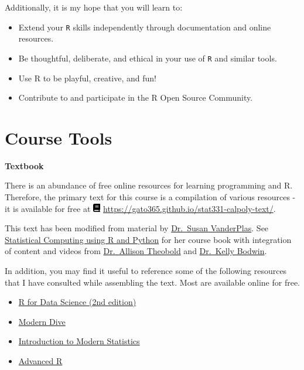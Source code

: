 \documentclass[
  11pt,
  letterpaper,
  DIV=11,
  numbers=noendperiod]{scrartcl}
\providecommand{\tightlist}{%
  \setlength{\itemsep}{0pt}\setlength{\parskip}{0pt}}\usepackage{longtable,booktabs,array}
\begin{document}
Additionally, it is my hope that you will learn to:

\begin{itemize}
\tightlist
\item
  Extend your \texttt{R} skills independently through documentation and
  online resources.
\item
  Be thoughtful, deliberate, and ethical in your use of \texttt{R} and
  similar tools.
\item
  Use R to be playful, creative, and fun!
\item
  Contribute to and participate in the R Open Source Community.
\end{itemize}

\hypertarget{course-tools}{%
\section{Course Tools}\label{course-tools}}

\textbf{Textbook}

There is an abundance of free online resources for learning programming
and R. Therefore, the primary text for this course is a compilation of
various resources - it is available for free at
\includegraphics[width=0.88em,height=1em]{index_files/figure-pdf/fa-icon-5ea3361430ab42477e0145b37bf037cc.pdf}
\url{https://gato365.github.io/stat331-calpoly-text/}.

This text has been modified from material by
\href{https://github.com/srvanderplas}{Dr.~Susan VanderPlas}. See
\href{https://srvanderplas.github.io/stat-computing-r-python/}{Statistical
Computing using R and Python} for her course book with integration of
content and videos from \href{https://github.com/atheobold}{Dr.~Allison
Theobold} and \href{https://github.com/kbodwin}{Dr.~Kelly Bodwin}.

In addition, you may find it useful to reference some of the following
resources that I have consulted while assembling the text. Most are
available online for free.

\begin{itemize}
\tightlist
\item
  \href{https://r4ds.hadley.nz/}{R for Data Science (2nd edition)}
\item
  \href{https://moderndive.com/1-getting-started.html}{Modern Dive}
\item
  \href{https://openintro-ims.netlify.app/}{Introduction to Modern
  Statistics}
\item
  \href{http://adv-r.had.co.nz/}{Advanced R}
\end{itemize}
\end{document}
